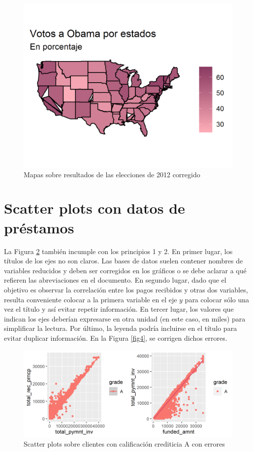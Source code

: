 \documentclass[10.5pt]{article}   %
\begin{document}
\begin{figure}[H]
\centering
\includegraphics[scale=1]{imgs/Obamavote2.png}
\caption{Mapas sobre resultados de las elecciones de 2012 corregido}
    \label{fig2}
\end{figure}


\section*{Scatter plots con datos de préstamos}
La Figura \ref{fig3} también incumple con los principios 1 y 2. En primer lugar, los títulos de los ejes no son claros. Las bases de datos suelen contener nombres de variables reducidos y deben ser corregidos en los gráficos o se debe aclarar a qué refieren las abreviaciones en el documento. En segundo lugar, dado que el objetivo es observar la correlación entre los pagos recibidos y otras dos variables, resulta conveniente colocar a la primera variable en el eje $y$ para colocar sólo una vez el título y así evitar repetir información. En tercer lugar, los valores que indican los ejes deberían expresarse en otra unidad (en este caso, en miles) para simplificar la lectura. Por último, la leyenda podría incluirse en el título para evitar duplicar información. En la Figura \ref{fig4}, se corrigen dichos errores.
\begin{figure}[H]
\centering
\includegraphics[scale=1.1]{imgs/scatter plot1.png}
\caption{Scatter plots sobre clientes con calificación crediticia A con errores}
    \label{fig3}
\end{figure}
\end{document}
